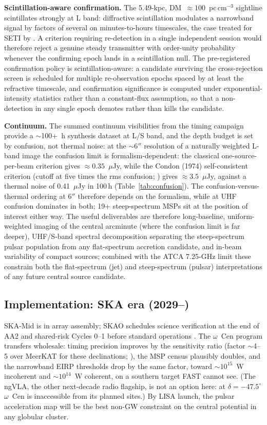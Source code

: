 \documentclass[11pt]{article}
\newcommand{\ocen}{\ensuremath{\omega}~Cen}
\begin{document}
\textbf{Scintillation-aware confirmation.} The 5.49-kpc, DM~$\approx 100$~pc\,cm$^{-3}$ sightline scintillates strongly at L band: diffractive scintillation modulates a narrowband signal by factors of several on minutes-to-hours timescales, the case treated for SETI by \citet{CordesLazioSagan1997}. A criterion requiring re-detection in a single independent session would therefore reject a genuine steady transmitter with order-unity probability whenever the confirming epoch lands in a scintillation null. The pre-registered confirmation policy is scintillation-aware: a candidate surviving the cross-rejection screen is scheduled for multiple re-observation epochs spaced by at least the refractive timescale, and confirmation significance is computed under exponential-intensity statistics rather than a constant-flux assumption, so that a non-detection in any single epoch demotes rather than kills the candidate.

\textbf{Continuum.} The summed continuum visibilities from the timing campaign provide a $\sim$100+~h synthesis dataset at L/S band, and the depth budget is set by confusion, not thermal noise: at the $\sim6''$ resolution of a naturally weighted L-band image the
confusion limit is formalism-dependent: the classical one-source-per-beam
criterion gives $\approx0.35$~$\mu$Jy, while the Condon (1974)
self-consistent criterion (cutoff at five times the rms confusion;
\citealt{Condon2007}) gives $\approx3.5$~$\mu$Jy, against a thermal
noise of 0.41~$\mu$Jy in 100\,h (Table~\ref{tab:confusion}). The
confusion-versus-thermal ordering at $6''$ therefore depends on the
formalism, while at UHF confusion dominates in both; 19+ steep-spectrum MSPs
sit at the position of interest either way. The useful deliverables are therefore long-baseline, uniform-weighted imaging of the central arcminute (where the confusion limit is far deeper), UHF/S-band spectral decomposition separating the steep-spectrum pulsar population from any flat-spectrum accretion candidate, and in-beam variability of compact sources; combined with the ATCA 7.25-GHz limit \citep{Mahida2026} these constrain both the flat-spectrum (jet) and steep-spectrum (pulsar) interpretations of any future central source candidate.

\subsection{Implementation: SKA era (2029--)}

SKA-Mid is in array assembly; SKAO schedules science verification at the end of AA2 and shared-risk Cycles 0--1 before standard operations \citep{SKAOtimeline}. The \ocen{} program transfers wholesale: timing precision improves by the sensitivity ratio (factor $\sim$4--5 over MeerKAT for these declinations; \citealt{Braun2019SKA}), the MSP census plausibly doubles, and the narrowband EIRP thresholds drop by the same factor, toward $\sim 10^{15}$~W incoherent and $\sim 10^{14}$~W coherent, on a southern target FAST cannot see. (The ngVLA, the other next-decade radio flagship, is not an option here: at $\delta = -47.5^{\circ}$ \ocen{} is inaccessible from its planned sites.) By LISA launch, the pulsar acceleration map will be the best non-GW constraint on the central potential in any globular cluster.
\end{document}
